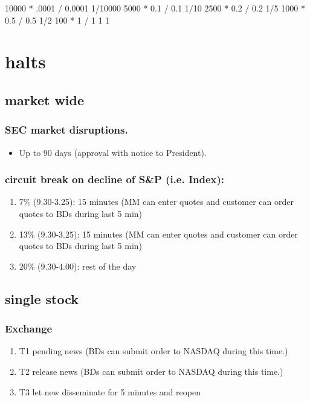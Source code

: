 \documentclass[11pt]{article}
\begin{document}
10000 * .0001 / 0.0001  1/10000
5000  * 0.1   / 0.1     1/10
2500  * 0.2   / 0.2     1/5
1000  * 0.5   / 0.5     1/2
100   * 1     / 1       1
1

\section{halts}
\label{sec:orgc8c2599}
\subsection{market wide}
\label{sec:org6a1b6ac}
\subsubsection{SEC market disruptions.}
\label{sec:org1ba7700}
\begin{itemize}
\item Up to 90 days (approval with notice to President).
\end{itemize}
\subsubsection{circuit break on decline of S\&P (i.e. Index):}
\label{sec:orgfa2d15f}
\begin{enumerate}
\item 7\%  (9.30-3.25): 15 minutes         (MM can enter quotes and customer can order quotes to BDs during last 5 min)
\label{sec:org5cd12c4}
\item 13\% (9.30-3.25): 15 minutes         (MM can enter quotes and customer can order quotes to BDs during last 5 min)
\label{sec:org45df23e}
\item 20\% (9.30-4.00): rest of the day
\label{sec:orgbe4bd10}
\end{enumerate}
\subsection{single stock}
\label{sec:org049a2e6}
\subsubsection{Exchange}
\label{sec:org7577bf1}
\begin{enumerate}
\item T1 pending news                                      (BDs can submit order to NASDAQ during this time.)
\label{sec:org46d28e6}
\item T2 release news                                      (BDs can submit order to NASDAQ during this time.)
\label{sec:org0ec396a}
\item T3 let new disseminate for 5 minutes and reopen
\label{sec:org497d1bb}
\end{enumerate}
\end{document}
